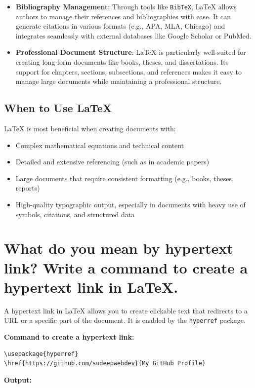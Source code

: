 \begin{itemize}
    \item \textbf{Bibliography Management}: Through tools like \texttt{BibTeX}, LaTeX allows authors to manage their references and bibliographies with ease. It can generate citations in various formats (e.g., APA, MLA, Chicago) and integrates seamlessly with external databases like Google Scholar or PubMed.
    \item \textbf{Professional Document Structure}: LaTeX is particularly well-suited for creating long-form documents like books, theses, and dissertations. Its support for chapters, sections, subsections, and references makes it easy to manage large documents while maintaining a professional structure.
\end{itemize}

\subsection{When to Use LaTeX}

LaTeX is most beneficial when creating documents with:
\begin{itemize}
    \item Complex mathematical equations and technical content
    \item Detailed and extensive referencing (such as in academic papers)
    \item Large documents that require consistent formatting (e.g., books, theses, reports)
    \item High-quality typographic output, especially in documents with heavy use of symbols, citations, and structured data
\end{itemize}



\section{What do you mean by hypertext link? Write a command to create a hypertext link in LaTeX.}
A hypertext link in LaTeX allows you to create clickable text that redirects to a URL or a specific part of the document. It is enabled by the \texttt{hyperref} package.

\textbf{Command to create a hypertext link:}
\begin{verbatim}
\usepackage{hyperref}
\href{https://github.com/sudeepwebdev}{My GitHub Profile}
\end{verbatim}

\textbf{Output:}

